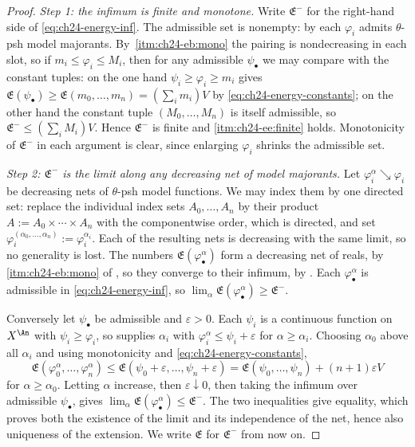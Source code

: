 \begin{proof}
\emph{Step 1: the infimum is finite and monotone.}  Write \(\mathfrak E^-\)
for the right-hand side of \eqref{eq:ch24-energy-inf}.  The admissible set is
nonempty: by  each \(\varphi_i\)
admits \(\theta\)-psh model majorants.  By
\,\cref{itm:ch24-eb:mono} the pairing is
nondecreasing in each slot, so if \(m_i\leq\varphi_i\leq M_i\), then for any
admissible \(\psi_\bullet\) we may compare with the constant tuples: on the
one hand \(\psi_i\geq\varphi_i\geq m_i\) gives
\(\mathfrak E(\psi_\bullet)\geq\mathfrak E(m_0,\ldots,m_n)
 =(\sum_im_i)V\) by \eqref{eq:ch24-energy-constants}; on the other hand the
constant tuple \((M_0,\ldots,M_n)\) is itself admissible, so
\(\mathfrak E^-\leq(\sum_iM_i)V\).  Hence \(\mathfrak E^-\) is finite and
\cref{itm:ch24-ee:finite} holds.  Monotonicity of \(\mathfrak E^-\) in each
argument is clear, since enlarging \(\varphi_i\) shrinks the admissible set.

\emph{Step 2: \(\mathfrak E^-\) is the limit along any decreasing net of
model majorants.}  Let \(\varphi_i^\alpha\searrow\varphi_i\) be decreasing
nets of \(\theta\)-psh model functions.  We may index them by one directed
set: replace the individual index sets \(A_0,\ldots,A_n\) by their product
\(A:=A_0\times\cdots\times A_n\) with the componentwise order, which is
directed, and set \(\varphi_i^{(\alpha_0,\ldots,\alpha_n)}
:=\varphi_i^{\alpha_i}\).  Each of the resulting nets is decreasing with the
same limit, so no generality is lost.  The
numbers \(\mathfrak E(\varphi_\bullet^\alpha)\) form a decreasing net of
reals, by \cref{itm:ch24-eb:mono} of , so they
converge to their infimum, by .  Each
\(\varphi_\bullet^\alpha\) is admissible in \eqref{eq:ch24-energy-inf}, so
\(\lim_\alpha\mathfrak E(\varphi^\alpha_\bullet)\geq\mathfrak E^-\).

Conversely let \(\psi_\bullet\) be admissible and \(\varepsilon>0\).  Each
\(\psi_i\) is a continuous function on \(X^{\An}\) with
\(\psi_i\geq\varphi_i\), so  supplies
\(\alpha_i\) with \(\varphi_i^\alpha\leq\psi_i+\varepsilon\) for
\(\alpha\geq\alpha_i\).  Choosing \(\alpha_0\) above all \(\alpha_i\) and
using monotonicity and \eqref{eq:ch24-energy-constants},
\[
 \mathfrak E(\varphi^\alpha_0,\ldots,\varphi^\alpha_n)
 \leq\mathfrak E(\psi_0+\varepsilon,\ldots,\psi_n+\varepsilon)
 =\mathfrak E(\psi_0,\ldots,\psi_n)+(n+1)\varepsilon V
\]
for \(\alpha\geq\alpha_0\).  Letting \(\alpha\) increase, then
\(\varepsilon\downarrow0\), then taking the infimum over admissible
\(\psi_\bullet\), gives
\(\lim_\alpha\mathfrak E(\varphi^\alpha_\bullet)\leq\mathfrak E^-\).  The two
inequalities give equality, which proves both the existence of the limit and
its independence of the net, hence also uniqueness of the extension.  We
write \(\mathfrak E\) for \(\mathfrak E^-\) from now on.


\end{proof}
